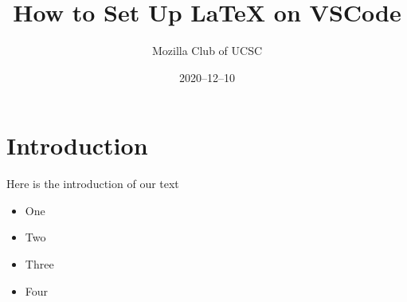 \documentclass[12pt]{article}
\title{How to Set Up LaTeX on VSCode}
\author{Mozilla Club of UCSC}
\date{2020–12–10}
\begin{document}
\maketitle

\section{Introduction}

Here is the introduction of our text

\begin{itemize}

\item One

\item Two

\item Three

\item Four

\end{itemize}
\end{document}
